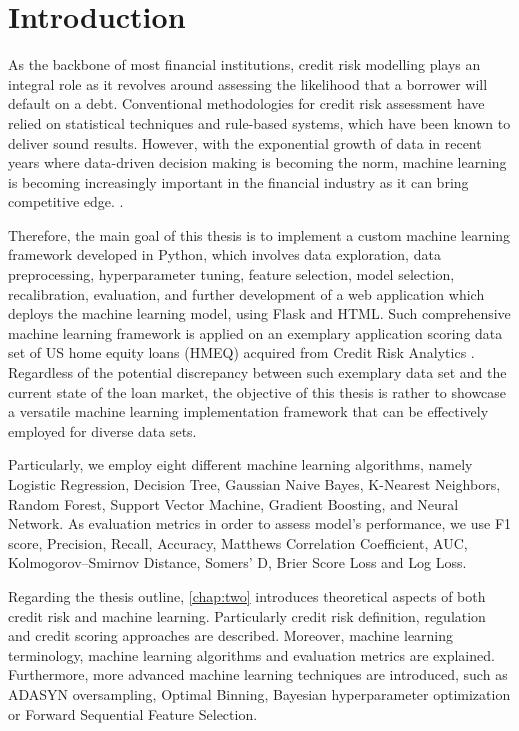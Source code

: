 \chapter{Introduction}
\label{chap:one}

As the backbone of most financial institutions, credit risk modelling plays an integral role as it  revolves around assessing the likelihood that a borrower will default on a debt.
Conventional methodologies for credit risk assessment have relied on statistical techniques and rule-based systems, which have been known to deliver sound results.
However, with the exponential growth of data in recent years where data-driven decision making is becoming the norm, machine learning is becoming increasingly important in the financial industry as it can bring competitive edge. \citep{PwC2023}.


Therefore, the main goal of this thesis is to implement a custom machine learning framework developed in Python, which involves data exploration, data preprocessing, hyperparameter tuning, feature selection, model selection, recalibration, evaluation, and further development of a web application which deploys the machine learning model, using Flask and HTML.
Such comprehensive machine learning framework is applied on an exemplary application scoring data set of US home equity loans (HMEQ) acquired from Credit Risk Analytics \citep{baesens2016credit}.
Regardless of the potential discrepancy between such exemplary data set and the current state of the loan market, the objective of this thesis is rather to showcase a versatile machine learning implementation framework that can be effectively employed for diverse data sets.


Particularly, we employ eight different machine learning algorithms, namely Logistic Regression, Decision Tree, Gaussian Naive Bayes, K-Nearest Neighbors, Random Forest, Support Vector Machine, Gradient Boosting, and Neural Network.
As evaluation metrics in order to assess model's performance, we use F1 score, Precision, Recall, Accuracy, Matthews Correlation Coefficient, AUC, Kolmogorov--Smirnov Distance, Somers' D, Brier Score Loss and Log Loss.


Regarding the thesis outline, \autoref{chap:two} introduces theoretical aspects of both credit risk  and machine learning. Particularly credit risk definition, regulation and credit scoring approaches are described. Moreover, machine learning terminology, machine learning algorithms and evaluation metrics are explained.
Furthermore, more advanced machine learning techniques are introduced, such as ADASYN oversampling, Optimal Binning, Bayesian hyperparameter optimization or Forward Sequential Feature Selection.

